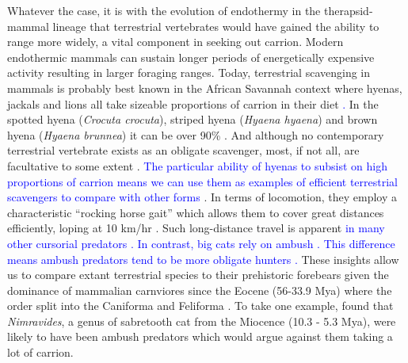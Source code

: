 \documentclass[a4paper,12pt]{article}
\begin{document}
Whatever the case, it is with the evolution of endothermy in the therapsid-mammal lineage \citep{clarke2010temperature} that terrestrial vertebrates would have gained the ability to range more widely, a vital component in seeking out carrion.
Modern endothermic mammals can sustain longer periods of energetically expensive activity \citep{bennett1979endothermy} resulting in larger foraging ranges. 
Today, terrestrial scavenging in mammals is probably best known in the African Savannah context where hyenas, jackals and lions all take sizeable proportions of carrion in their diet \textcolor{blue}{\citep{pereira2014facultative,periquet2015lion}.}
In the spotted hyena (\textit{Crocuta crocuta}), striped hyena (\textit{Hyaena hyaena}) and brown hyena (\textit{Hyaena brunnea}) it can be over 90\% \citep{jones2015african}.
And although no contemporary terrestrial vertebrate exists as an obligate scavenger, most, if not all, are facultative to some extent \textcolor{blue}{\citep{devault2003scavenging,beasley2015vertebrates,pereira2014facultative}}.
\textcolor{blue}{The particular ability of hyenas to subsist on high proportions of carrion means we can use them as examples of efficient terrestrial scavengers to compare with other forms \citep{periquet2015lion}}. 
In terms of locomotion, they employ a characteristic ``rocking horse gait''  which allows them to cover great distances efficiently, loping at 10 km/hr \citep{mills1989comparative,jones2015african}. 
Such long-distance travel is apparent \textcolor{blue}{in many other cursorial predators \citep{pennycuick1995radius,janis2014forelimb,pereira2014facultative}. 
In contrast, big cats rely on ambush \citep{pennycuick1995radius,pereira2014facultative}. 
This difference means ambush predators tend to be more obligate hunters \citep{pereira2014facultative}.} 
These insights allow us to compare extant terrestrial species to their prehistoric forebears given the dominance of mammalian carnviores since the Eocene (56-33.9 Mya) where the order split into the Caniforma and Feliforma \citep{van1987skeletal}.
To take one example, \cite{anyonge1996locomotor} found that \textit{Nimravides}, a genus of sabretooth cat from the Miocence (10.3 - 5.3 Mya), were likely to have been ambush predators which would argue against them taking a lot of carrion. 
\end{document}
